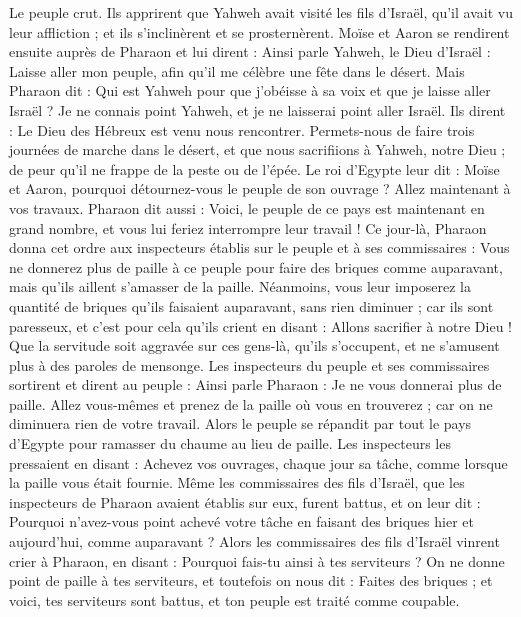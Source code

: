 \begin{multicols}{2}
Le peuple crut. Ils apprirent que Yahweh avait visité les fils d'Israël, qu'il avait vu leur affliction ; et ils s'inclinèrent et se prosternèrent.
\VerseOne{}Moïse et Aaron se rendirent ensuite auprès de Pharaon et lui dirent : Ainsi parle Yahweh, le Dieu d'Israël : Laisse aller mon peuple, afin qu'il me célèbre une fête dans le désert.
Mais Pharaon dit : Qui est Yahweh pour que j'obéisse à sa voix et que je laisse aller Israël ? Je ne connais point Yahweh, et je ne laisserai point aller Israël.
Ils dirent : Le Dieu des Hébreux est venu nous rencontrer. Permets-nous de faire trois journées de marche dans le désert, et que nous sacrifiions à Yahweh, notre Dieu ; de peur qu'il ne frappe de la peste ou de l'épée.
Le roi d'Egypte leur dit : Moïse et Aaron, pourquoi détournez-vous le peuple de son ouvrage ? Allez maintenant à vos travaux.
Pharaon dit aussi : Voici, le peuple de ce pays est maintenant en grand nombre, et vous lui feriez interrompre leur travail !
Ce jour-là, Pharaon donna cet ordre aux inspecteurs établis sur le peuple et à ses commissaires :
Vous ne donnerez plus de paille à ce peuple pour faire des briques comme auparavant, mais qu'ils aillent s’amasser de la paille.
Néanmoins, vous leur imposerez la quantité de briques qu'ils faisaient auparavant, sans rien diminuer ; car ils sont paresseux, et c'est pour cela qu'ils crient en disant : Allons sacrifier à notre Dieu !
Que la servitude soit aggravée sur ces gens-là, qu'ils s'occupent, et ne s'amusent plus à des paroles de mensonge.
Les inspecteurs du peuple et ses commissaires sortirent et dirent au peuple : Ainsi parle Pharaon : Je ne vous donnerai plus de paille.
Allez vous-mêmes et prenez de la paille où vous en trouverez ; car on ne diminuera rien de votre travail.
Alors le peuple se répandit par tout le pays d'Egypte pour ramasser du chaume au lieu de paille.
Les inspecteurs les pressaient en disant : Achevez vos ouvrages, chaque jour sa tâche, comme lorsque la paille vous était fournie.
Même les commissaires des fils d'Israël, que les inspecteurs de Pharaon avaient établis sur eux, furent battus, et on leur dit : Pourquoi n'avez-vous point achevé votre tâche en faisant des briques hier et aujourd'hui, comme auparavant ?
Alors les commissaires des fils d'Israël vinrent crier à Pharaon, en disant : Pourquoi fais-tu ainsi à tes serviteurs ?
On ne donne point de paille à tes serviteurs, et toutefois on nous dit : Faites des briques ; et voici, tes serviteurs sont battus, et ton peuple est traité comme coupable.

\end{multicols}
